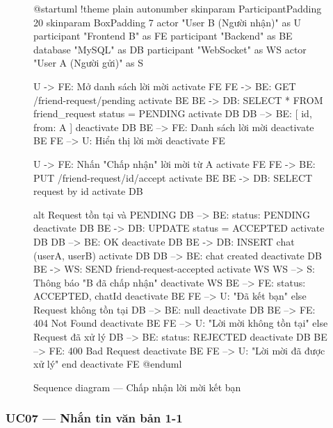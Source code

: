 \documentclass[12pt,a4paper]{report}
\begin{document}
\begin{figure}[H]
    \centering
    \begin{plantuml}
        @startuml
        !theme plain
        autonumber
        skinparam ParticipantPadding 20
        skinparam BoxPadding 7
        actor "User B (Người nhận)" as U
        participant "Frontend B" as FE
        participant "Backend" as BE
        database "MySQL" as DB
        participant "WebSocket" as WS
        actor "User A (Người gửi)" as S

        U -> FE: Mở danh sách lời mời
        activate FE
        FE -> BE: GET /friend-request/pending
        activate BE
        BE -> DB: SELECT * FROM friend_request \nWHERE status = PENDING
        activate DB
        DB --> BE: [{ id, from: A }]
        deactivate DB
        BE --> FE: Danh sách lời mời
        deactivate BE
        FE --> U: Hiển thị lời mời
        deactivate FE

        U -> FE: Nhấn "Chấp nhận" lời mời từ A
        activate FE
        FE -> BE: PUT /friend-request/{id}/accept
        activate BE
        BE -> DB: SELECT request by id
        activate DB

        alt Request tồn tại và PENDING
          DB --> BE: { status: PENDING }
          deactivate DB
          BE -> DB: UPDATE status = ACCEPTED
          activate DB
          DB --> BE: OK
          deactivate DB
          BE -> DB: INSERT chat \n(userA, userB)
          activate DB
          DB --> BE: chat created
          deactivate DB
          BE -> WS: SEND friend-request-accepted
          activate WS
          WS --> S: Thông báo "B đã chấp nhận"
          deactivate WS
          BE --> FE: { status: ACCEPTED, chatId }
          deactivate BE
          FE --> U: "Đã kết bạn"
        else Request không tồn tại
          DB --> BE: null
          deactivate DB
          BE --> FE: 404 Not Found
          deactivate BE
          FE --> U: "Lời mời không tồn tại"
        else Request đã xử lý
          DB --> BE: { status: REJECTED }
          deactivate DB
          BE --> FE: 400 Bad Request
          deactivate BE
          FE --> U: "Lời mời đã được xử lý"
        end
        deactivate FE
        @enduml
    \end{plantuml}
    \caption{Sequence diagram --- Chấp nhận lời mời kết bạn}
\end{figure}

\subsubsection{UC07 --- Nhắn tin văn bản 1-1}
\end{document}
